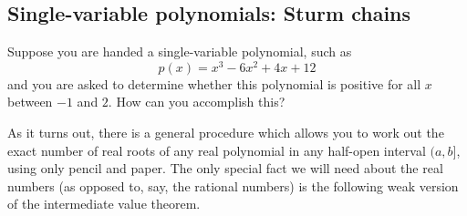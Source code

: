 \begin{comment}
\begin{exer} Show that the dual of the dual is the primal.
\end{exer}

\begin{exer} Show that we only need either the primal or the dual to be
  feasible for strong duality to hold. More precisely, if the primal
  is feasible but the dual is infeasible, prove that the primal will
  be unbounded, implying that $z^*=w^*=+\infty$.
\end{exer}

Looking at $c^Tx=y^TAx\leq b^Ty$, we observe that to get equality
between $c^Tx$ and $b^Ty$, we need {\it complementary slackness}:

\begin{thm}[Complementary Slackness]
If $x$ is feasible in $(P)$ and $y$ is feasible in $(D)$ then $x$ is
optimum in $(P)$ and $y$ is optimum in $(D)$ if and only if for all
$i$ either $y_i=0$ or $\sum_j a_{ij} x_j =b_i$ (or both). 
\end{thm}
\end{comment}


\subsection{Single-variable polynomials: Sturm chains}

Suppose you are handed a single-variable polynomial, such as
\[
p(x) = x^3 - 6x^2 + 4x + 12
\]
and you are asked to determine whether this polynomial is positive for all $x$ between $-1$ and $2$. How can you accomplish this?

As it turns out, there is a general procedure which allows you to work out the exact number of real roots of any real polynomial in any half-open interval $(a,b]$, using only pencil and paper. The only special fact we will need about the real numbers (as opposed to, say, the rational numbers) is the following weak version of the intermediate value theorem.

